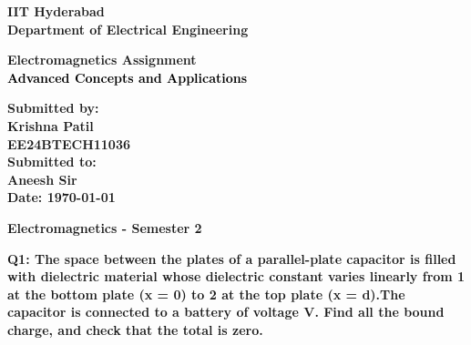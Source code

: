 \documentclass[a4paper]{article}
\begin{document}

\begin{titlepage}
    \centering
    \vspace*{1cm}
    
    {\Huge \textbf{\textcolor{myblue}{IIT Hyderabad}}}\\[1cm]
    
    
    {\large \textbf{\textcolor{myred}{Department of Electrical Engineering}}}\\[1.5cm]
    
\begin{tcolorbox}[colframe=myred, colback=myblue!10, sharp corners=south, width=0.85\textwidth, center]
    \centering
    {\huge \textbf{\textcolor{myblue}{Electromagnetics Assignment}}}\\[0.3cm]
    {\large \textbf{\textcolor{black}{Advanced Concepts and Applications}}}
\end{tcolorbox}

\vspace{1.5cm}
    
    
    {\Large \textbf{Submitted by:}}\\[0.3cm]
    {\Large \textbf{\textcolor{mygreen}{Krishna Patil}}}\\
    {\large \textbf{EE24BTECH11036}}\\[0.5cm]
    
    {\Large \textbf{Submitted to:}}\\[0.3cm]
    {\Large \textbf{\textcolor{myred}{Aneesh Sir}}}\\[1cm]
    
    {\large \textbf{Date: \today}}\\[2cm]
    
    \vfill
    
    {\Large \textbf{\textcolor{myblue}{Electromagnetics - Semester 2}}}
    
\end{titlepage}

\begin{tcolorbox}[colframe=myred, colback=myred!10, sharp corners=south, width=0.95\textwidth, boxrule=0.8mm, breakable]
    \textbf{Q1: The space between the plates of a parallel-plate capacitor is filled with dielectric material whose dielectric constant varies linearly from 1 at the bottom plate (x = 0) to 2 at the top plate (x = d).The capacitor is connected to a battery of voltage V. Find all the bound charge, and check that the total is zero.}
\end{tcolorbox}
\end{document}
